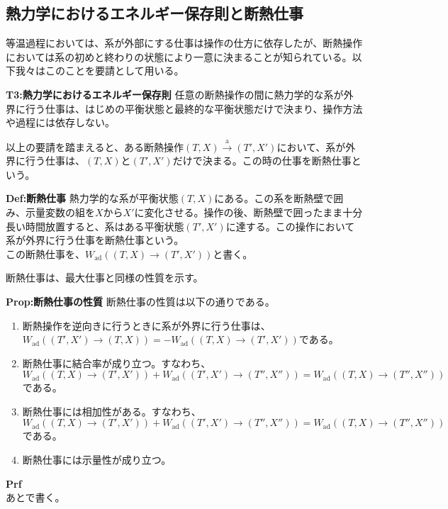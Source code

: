 \documentclass[a4paper,11pt]{jsarticle}
\numberwithin{equation}{section}
\begin{document}
\subsection{熱力学におけるエネルギー保存則と断熱仕事}
等温過程においては、系が外部にする仕事は操作の仕方に依存したが、断熱操作においては系の初めと終わりの状態により一意に決まることが知られている。以下我々はこのことを要請として用いる。\\
\begin{itembox}[l]{\textbf{T3:熱力学におけるエネルギー保存則}}
    任意の断熱操作の間に熱力学的な系が外界に行う仕事は、はじめの平衡状態と最終的な平衡状態だけで決まり、操作方法や過程には依存しない。
\end{itembox}
以上の要請を踏まえると、ある断熱操作$(T,X) \xrightarrow{\text{a}} (T',X')$において、系が外界に行う仕事は、$(T,X)$と$(T',X')$だけで決まる。この時の仕事を断熱仕事という。\\
\begin{itembox}[l]{\textbf{Def:断熱仕事}}
    熱力学的な系が平衡状態$(T,X)$にある。この系を断熱壁で囲み、示量変数の組を$X$から$X'$に変化させる。操作の後、断熱壁で囲ったまま十分長い時間放置すると、系はある平衡状態$(T',X')$に達する。この操作において系が外界に行う仕事を断熱仕事という。\\
    この断熱仕事を、$W_{\text{ad}}((T,X)\rightarrow (T',X'))$と書く。
\end{itembox}
断熱仕事は、最大仕事と同様の性質を示す。\\
\begin{itembox}[l]{\textbf{Prop:断熱仕事の性質}}
    断熱仕事の性質は以下の通りである。
    \begin{enumerate}
        \item 断熱操作を逆向きに行うときに系が外界に行う仕事は、$W_{\text{ad}}((T',X')\rightarrow (T,X)) = -W_{\text{ad}}((T,X)\rightarrow (T',X'))$である。
        \item 断熱仕事に結合率が成り立つ。すなわち、$W_{\text{ad}}((T,X)\rightarrow (T',X'))+W_{\text{ad}}((T',X')\rightarrow (T'',X'')) = W_{\text{ad}}((T,X)\rightarrow (T'',X''))$である。
        \item 断熱仕事には相加性がある。すなわち、$W_{\text{ad}}((T,X)\rightarrow (T',X'))+W_{\text{ad}}((T',X')\rightarrow (T'',X'')) = W_{\text{ad}}((T,X)\rightarrow (T'',X''))$である。
        \item 断熱仕事には示量性が成り立つ。
    \end{enumerate} 
\end{itembox}
\textbf{Prf}\\
あとで書く。\\
\end{document}

